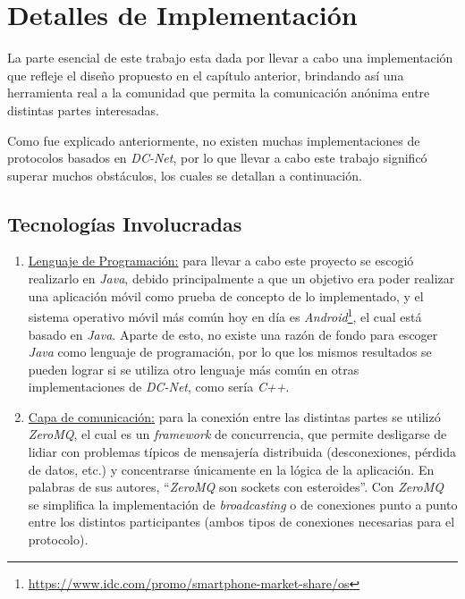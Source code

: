 \chapter{Detalles de Implementación}\label{cap4}

La parte esencial de este trabajo esta dada por llevar a cabo una 
implementación que refleje el diseño propuesto en el capítulo anterior, 
brindando así una herramienta real a la comunidad que permita la comunicación 
anónima entre distintas partes interesadas.

Como fue explicado anteriormente, no existen muchas implementaciones de 
protocolos basados en \emph{DC-Net}, por lo que llevar a cabo este trabajo significó 
superar muchos obstáculos, los cuales se detallan a continuación.

\section{Tecnologías Involucradas}

\begin{enumerate}
    \item \underline{Lenguaje de Programación:} para llevar a cabo este 
    proyecto se escogió realizarlo en \emph{Java}, debido principalmente a que 
    un objetivo era poder realizar una aplicación móvil como prueba de 
    concepto de lo implementado, y el sistema operativo móvil más común hoy en 
    día es \emph{Android}\footnote{\url{https://www.idc.com/promo/smartphone-market-share/os}}, el 
    cual está basado en \emph{Java}. Aparte de esto, no existe una razón de 
    fondo para escoger \emph{Java} como lenguaje de programación, por lo que 
    los mismos resultados se pueden lograr si se utiliza otro 
    lenguaje más común en otras implementaciones de \emph{DC-Net}, como sería 
    \emph{C++}.

    \item \underline{Capa de comunicación:} para la conexión entre las 
    distintas partes se utilizó \emph{ZeroMQ}, el cual es un \emph{framework} 
    de concurrencia, que permite desligarse de lidiar con problemas típicos de 
    mensajería distribuida (desconexiones, pérdida de datos, etc.) y 
    concentrarse únicamente en la lógica de la aplicación. En palabras de sus 
    autores, ``\emph{ZeroMQ} son sockets con esteroides''. Con \emph{ZeroMQ} 
    se simplifica la implementación de \emph{broadcasting} o de conexiones punto 
    a punto entre los distintos participantes (ambos tipos de conexiones 
    necesarias para el protocolo).
\end{enumerate}

